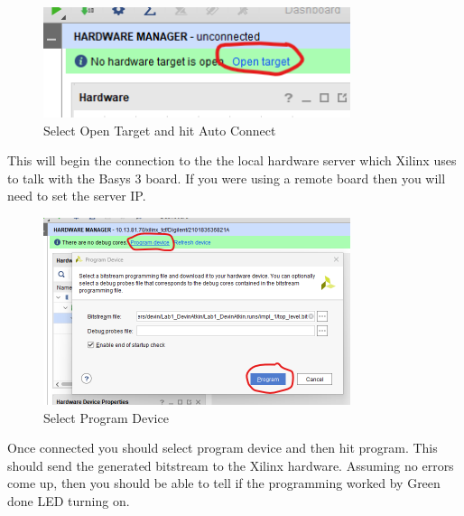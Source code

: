     \begin{figure}[H]
        \centering
        \includegraphics[width=9cm]{Images/CreateBitstreamImages/Vivado_OpenTarget.png}
        \caption{Select Open Target and hit Auto Connect}
        \label{fig:enter-label}
    \end{figure}
    This will begin the connection to the the local hardware server which Xilinx uses to talk with the Basys 3 board. If you were using a remote board then you will need to set the server IP. 
    
    \begin{figure}[H]
        \centering
        \includegraphics[width=9cm]{Images/CreateBitstreamImages/Vivado_ProgramHardware.png}
        \caption{Select Program Device}
        \label{fig:enter-label}
    \end{figure}
    Once connected you should select program device and then hit program. This should send the generated bitstream to the Xilinx hardware. Assuming no errors come up, then you should be able to tell if the programming worked by Green done LED turning on. 
\else
\fi